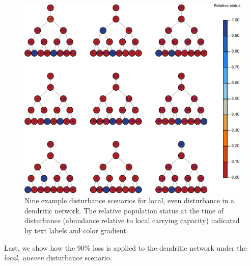 \documentclass[
]{article}
\begin{document}
\begin{figure}[H]

{\centering \includegraphics{Managing_for_ecological_surprises_in_metapopulations_files/figure-latex/example local even spatial disturbance-1} 

}

\caption{Nine example disturbance scenarios for local, even disturbance in a dendritic network. The relative population status at the time of disturbance (abundance relative to local carrying capacity) indicated by text labels and color gradient.}\label{fig:example local even spatial disturbance}
\end{figure}
\newpage

Last, we show how the 90\% loss is applied to the dendritic network
under the \emph{local, uneven} disturbance scenario.
\end{document}
